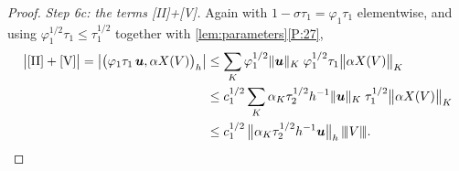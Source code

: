 \begin{proof}
\smallskip\noindent\emph{Step 6c: the terms \textup{[II]+[V]}.}
Again with $1-\sigma\tau_1=\varphi_1\tau_1$ elementwise, and using
$\varphi_1^{1/2}\tau_1\le\tau_1^{1/2}$ together with
\cref{lem:parameters}\ref{P:27},
\begin{align}
  \bigl|\textup{[II]}+\textup{[V]}\bigr|
  = \bigl|\bigl(\varphi_1\tau_1\,\boldsymbol{u},\alpha X(V)\bigr)_h\bigr|
  &\le \sum_K \varphi_1^{1/2}\lVert\boldsymbol{u}\rVert_K\;
  \varphi_1^{1/2}\tau_1\bigl\lVert\alpha X(V)\bigr\rVert_K
  \nonumber\\
  &\le c_1^{1/2}\sum_K \alpha_K\tau_2^{1/2}h^{-1}\lVert\boldsymbol{u}\rVert_K\;
  \tau_1^{1/2}\bigl\lVert\alpha X(V)\bigr\rVert_K
  \nonumber\\
  &\le c_1^{1/2}\,
  \bigl\lVert\alpha_K\tau_2^{1/2}h^{-1}\boldsymbol{u}\bigr\rVert_h\,{\lvert\kern-0.25ex\lvert\kern-0.25ex\lvert V \rvert\kern-0.25ex\rvert\kern-0.25ex\rvert}.
  \label{eq:IIVterm}
\end{align}


\end{proof}
